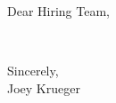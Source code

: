 \documentclass[11pt,letterpaper]{letter}
\begin{document}
\address{Joseph Laurent Krueger \\ Seattle, WA \\ Email: josephfkrueger@protonmail.com \\ Phone: (360) 763-3490 \\ \today}
\date{} %
\begin{letter}{}
\opening{Dear {\companyname} Hiring Team,}
\\
\closing{Sincerely, \\ Joey Krueger}
\end{letter}

\end{document}
